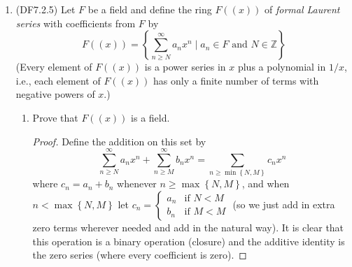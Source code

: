 \documentclass[11pt]{article}
\newcommand{\cbr}[1]{\left\{#1\right\}}
\begin{document}
\begin{enumerate}
\begin{proof}
        We show that the product of any two nonzero power series is nonzero. Let $\sum_{n=0}^\infty a_nx^n$ and $\sum_{n=0}^\infty b_nx^n$ be two nonzero power series; that is, at least one of the coefficients $a_n, b_n$ are nonzero. Let $a_i$ be the first nonzero coefficient in $\sum_{n=0}^\infty a_nx^n$ and let $b_j$ be the first nonzero coefficient in $\sum_{n=0}^\infty b_nx^n$. Then in the product $\sum_{n=0}^\infty a_nx^n\times \sum_{n=0}^\infty b_nx^n$, the coefficient of $x^{i+j}$ is given by $(a_0b_{i+j} + \cdots + a_ib_j + \cdots a_{i+j}b_0)$. By our choice of $a_i, b_j$, it follows that every term vanishes except for $a_ib_j$, since $R$ is an integral domain. It follows that the coefficient of $x^{i+j}$ in the product is nonzero. It did not matter what happened to any of the other terms in the product since we have shown that there is at least one nonzero term; hence the product $\sum_{n=0}^\infty a_nx^n\times \sum_{n=0}^\infty b_nx^n$ does not vanish. Since $\sum_{n=0}^\infty a_nx^n$ and $\sum_{n=0}^\infty a_nx^n$ were arbitrary nonzero power series, it follows that there are no zero divisors in $R[[x]]$, meaning that $R[[x]]$ is an integral domain. 
    \end{proof}
    \item (DF7.2.5) Let $F$ be a field and define the ring $F((x))$ of \textit{formal Laurent series} with coefficients from $F$ by \[F((x)) = \cbr{\sum_{n\geq N}^{\infty} a_nx^n \mid a_n\in F\text{ and } N\in \mathbb{Z}}\] (Every element of $F((x))$ is a power series in $x$ plus a polynomial in $1/x$, i.e., each element of $F((x))$ has only a finite number of terms with negative powers of $x$.) \begin{enumerate}
        \item Prove that $F((x))$ is a field. \begin{proof}
            Define the addition on this set by \[\sum_{n\geq N}^{\infty} a_nx^n + \sum_{n\geq M}^{\infty} b_nx^n = \sum_{n\geq \min\cbr{N,M}}c_nx^n\] where $c_n = a_n+b_n$ whenever $n\geq \max\cbr{N,M}$, and when $n< \max\cbr{N,M}$ let $c_n = \begin{cases}
                a_n &\text{if } N<M\\
                b_n &\text{if }M< M
            \end{cases}$ (so we just add in extra zero terms wherever needed and add in the natural way). It is clear that this operation is a binary operation (closure) and the additive identity is the zero series (where every coefficient is zero).
            

\end{proof}
\end{enumerate}
\end{enumerate}
\end{document}
